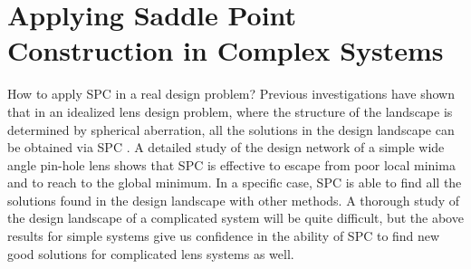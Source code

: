 \chapter{Applying Saddle Point Construction in Complex Systems} %
\label{chapter_4} %
\graphicspath{ {./chapter-4/figures/} }  %
\captionsetup[figure]{labelfont=bf}
\captionsetup{margin=1.5em}
\captionsetup[table]{labelfont=bf}







How to apply SPC in a real design problem?  
Previous investigations have shown that in an idealized lens design problem, where the structure of the landscape is determined by spherical aberration, all the solutions in the design landscape can be obtained via SPC \cite{PascalTriplet2009}. A detailed study of the design network of a simple wide angle pin-hole lens \cite{HouSimple16} shows that SPC is effective to escape from poor local minima and to reach to the global minimum. In a specific case, SPC is able to find all the solutions found in the design landscape with other methods. A thorough study of the design landscape of a complicated system will be quite difficult, but the above results for simple systems give us confidence in the ability of SPC to find new good solutions for complicated lens systems as well. 

